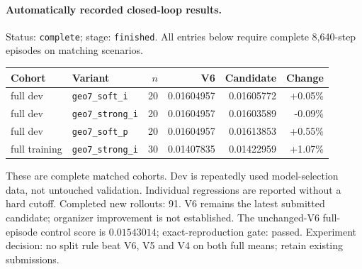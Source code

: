 \paragraph{Automatically recorded closed-loop results.}
Status: \texttt{complete}; stage: \texttt{finished}.
All entries below require complete 8,640-step episodes on matching scenarios.
\begin{center}\small
\begin{tabular}{llrrrr}\toprule
Cohort & Variant & $n$ & V6 & Candidate & Change \\\midrule
full dev & \texttt{geo7\_soft\_i} & 20 & 0.01604957 & 0.01605772 & +0.05\% \\
full dev & \texttt{geo7\_strong\_i} & 20 & 0.01604957 & 0.01603589 & -0.09\% \\
full dev & \texttt{geo7\_soft\_p} & 20 & 0.01604957 & 0.01613853 & +0.55\% \\
full training & \texttt{geo7\_strong\_i} & 30 & 0.01407835 & 0.01422959 & +1.07\% \\
\bottomrule\end{tabular}\end{center}
These are complete matched cohorts. Dev is repeatedly used model-selection data, not untouched validation. Individual regressions are reported without a hard cutoff.
Completed new rollouts: 91. V6 remains the latest submitted candidate; organizer improvement is not established.
The unchanged-V6 full-episode control score is $0.01543014$; exact-reproduction gate: passed.
Experiment decision: no split rule beat V6, V5 and V4 on both full means; retain existing submissions.
